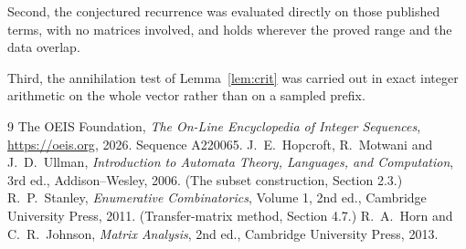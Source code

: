 \documentclass[11pt,a4paper]{article}
\theoremstyle{plain}
\theoremstyle{definition}
\begin{document}
Second, the conjectured recurrence was evaluated directly on those published terms, with no
matrices involved, and holds wherever the proved range and the data overlap.

Third, the annihilation test of Lemma~\ref{lem:crit} was carried out in exact integer
arithmetic on the whole vector rather than on a sampled prefix.

\begin{thebibliography}{9}
 The OEIS Foundation, \emph{The On-Line Encyclopedia of Integer
Sequences}, \url{https://oeis.org}, 2026. Sequence A220065.
 J.~E.~Hopcroft, R.~Motwani and J.~D.~Ullman, \emph{Introduction to Automata
Theory, Languages, and Computation}, 3rd ed., Addison--Wesley, 2006. (The subset
construction, Section 2.3.)
 R.~P.~Stanley, \emph{Enumerative Combinatorics}, Volume 1, 2nd ed.,
Cambridge University Press, 2011. (Transfer-matrix method, Section 4.7.)
 R.~A.~Horn and C.~R.~Johnson, \emph{Matrix Analysis}, 2nd ed., Cambridge
University Press, 2013.
\end{thebibliography}
\end{document}
